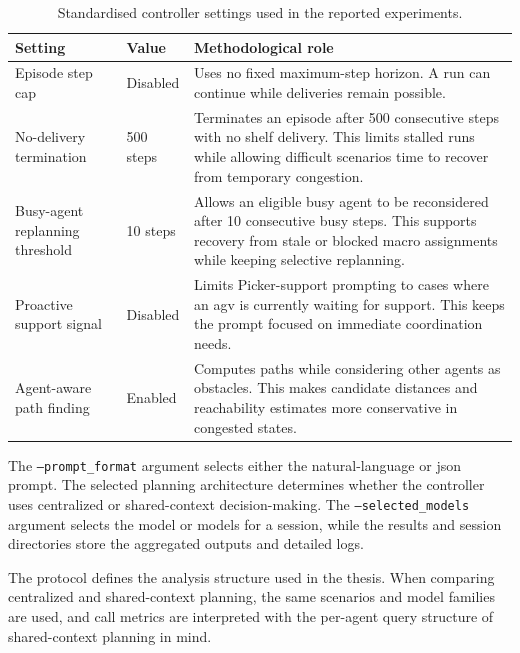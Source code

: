 \begin{table}[H]
\centering
\small
\setlength{\tabcolsep}{4pt}
\begin{tabular}{|p{}|p{}|p{}|}
\hline
\textbf{Setting} & \textbf{Value} & \textbf{Methodological role} \\
\hline
Episode step cap & Disabled & Uses no fixed maximum-step horizon. A run can continue while deliveries remain possible. \\
\hline
No-delivery termination & 500 steps & Terminates an episode after 500 consecutive steps with no shelf delivery. This limits stalled runs while allowing difficult scenarios time to recover from temporary congestion. \\
\hline
Busy-agent replanning threshold & 10 steps & Allows an eligible busy agent to be reconsidered after 10 consecutive busy steps. This supports recovery from stale or blocked macro assignments while keeping selective replanning. \\
\hline
Proactive support signal & Disabled & Limits Picker-support prompting to cases where an \gls{agv} is currently waiting for support. This keeps the prompt focused on immediate coordination needs. \\
\hline
Agent-aware path finding & Enabled & Computes paths while considering other agents as obstacles. This makes candidate distances and reachability estimates more conservative in congested states. \\
\hline
\end{tabular}
\caption{Standardised controller settings used in the reported experiments.}
\label{tab:controller-settings}
\end{table}

The \texttt{--prompt\_format} argument selects either the natural-language or \gls{json} prompt.
The selected planning architecture determines whether the controller uses centralized or shared-context decision-making.
The \texttt{--selected\_models} argument selects the model or models for a session, while the results and session directories store the aggregated outputs and detailed logs.

The protocol defines the analysis structure used in the thesis.
When comparing centralized and shared-context planning, the same scenarios and model families are used, and call metrics are interpreted with the per-agent query structure of shared-context planning in mind.

